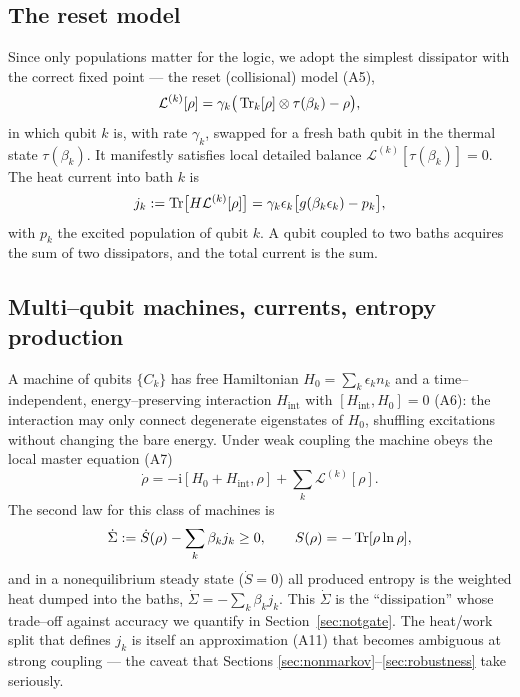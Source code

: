 \documentclass[11pt,a4paper]{article}
\theoremstyle{plain}
\theoremstyle{definition}
\theoremstyle{remark}
\newcommand{\ii}{\mathrm{i}}
\newcommand{\calL}{\mathcal{L}}
\begin{document}
\subsection{The reset model}
\label{sec:reset}
Since only populations matter for the logic, we adopt the simplest
dissipator with the correct fixed point --- the reset (collisional)
model (A5),
\begin{equation}
\calL^{(k)}[\rho]=\gamma_k\big(\Tr_k[\rho]\otimes\tau(\beta_k)-\rho\big),
\label{eq:reset}
\end{equation}
in which qubit $k$ is, with rate $\gamma_k$, swapped for a fresh bath
qubit in the thermal state $\tau(\beta_k)$. It manifestly satisfies local
detailed balance $\calL^{(k)}[\tau(\beta_k)]=0$. The heat current into
bath $k$ is
\begin{equation}
j_k:=\Tr\!\big[H\calL^{(k)}[\rho]\big]
=\gamma_k\epsilon_k\big[g(\beta_k\epsilon_k)-p_k\big],
\label{eq:current-reset}
\end{equation}
with $p_k$ the excited population of qubit $k$. A qubit coupled to two
baths acquires the sum of two dissipators, and the total current is the
sum.

\subsection{Multi--qubit machines, currents, entropy production}
\label{sec:machine}
A machine of qubits $\{C_k\}$ has free Hamiltonian
$H_0=\sum_k\epsilon_k n_k$ and a time--independent, energy--preserving
interaction $H_{\mathrm{int}}$ with $[H_{\mathrm{int}},H_0]=0$ (A6): the
interaction may only connect degenerate eigenstates of $H_0$, shuffling
excitations without changing the bare energy. Under weak coupling the
machine obeys the local master equation (A7)
\begin{equation}
\dot\rho=-\ii[H_0+H_{\mathrm{int}},\rho]+\sum_k\calL^{(k)}[\rho].
\label{eq:local-me}
\end{equation}
The second law for this class of machines is
\begin{equation}
\dot\Sigma:=\dot S(\rho)-\sum_k\beta_k j_k \ge 0,\qquad
S(\rho)=-\Tr[\rho\ln\rho],
\label{eq:entropy-prod}
\end{equation}
and in a nonequilibrium steady state ($\dot S=0$) all produced entropy is
the weighted heat dumped into the baths, $\dot\Sigma=-\sum_k\beta_k j_k$.
This $\dot\Sigma$ is the ``dissipation'' whose trade--off against
accuracy we quantify in Section~\ref{sec:notgate}. The heat/work split
that defines $j_k$ is itself an approximation (A11) that becomes
ambiguous at strong coupling --- the caveat that Sections
\ref{sec:nonmarkov}--\ref{sec:robustness} take seriously.
\end{document}
